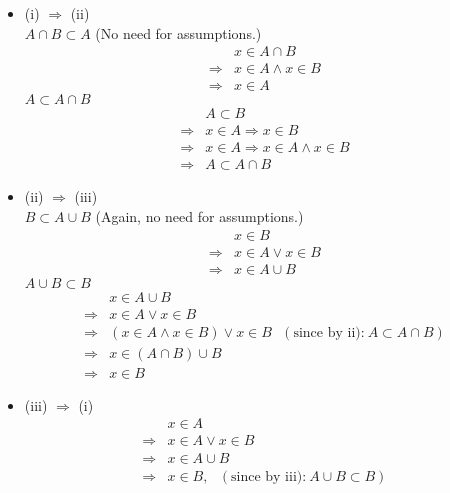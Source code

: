 {\color{solution}
\begin{itemize}
		\item (i) $\Rightarrow$ (ii)\\
		$A \cap B \subset A$ (No need for assumptions.)
		\begin{align*}
			&x \in A \cap B\\
			\Rightarrow&x \in A \land x \in B\\
			\Rightarrow&x \in A
		\end{align*}
		$A\subset A  \cap B $
		\begin{align*}
		&A \subset B\\
		\Rightarrow&x \in A \Rightarrow x \in B \\
		\Rightarrow&x \in A \Rightarrow x \in A \land x \in B\\
		\Rightarrow&A\subset A  \cap B 
		\end{align*}
%		
		\item (ii) $\Rightarrow$ (iii)\\
		$B \subset A \cup B $ (Again, no need for assumptions.) 
		\begin{align*}
		 &x\in B\\
		\Rightarrow&x \in A \lor x \in B \\
		\Rightarrow&x \in A\cup B
		\end{align*}
		$A \cup B \subset B$\\
		\begin{align*}
			&x \in A \cup B\\
			\Rightarrow&x \in A \lor x \in B\\
			\Rightarrow&(x \in A \land x \in B) \lor x \in B ~~~(\text{since by ii):}~A\subset A\cap B)\\
			\Rightarrow&x \in (A\cap B)\cup B\\
			\Rightarrow& x \in B
		\end{align*}
%		
		\item (iii) $\Rightarrow$ (i)\\
		\begin{align*}
			&x \in A \\
			\Rightarrow& x \in A \lor x \in B\\
			\Rightarrow& x \in A \cup B  \\
			\Rightarrow& x \in B,~~~(\text{since by iii):}~A\cup B \subset B )
		\end{align*}
	\end{itemize}
}